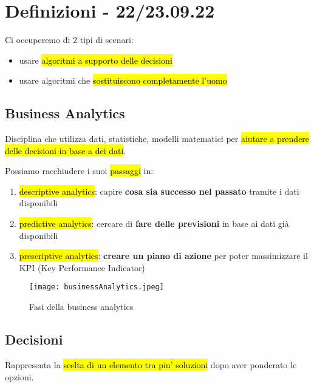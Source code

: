 \section{Definizioni - 22/23.09.22}

Ci occuperemo di 2 tipi di scenari:
\begin{itemize}
	\item usare \hl{algoritmi a supporto delle decisioni}
	\item usare algoritmi che \hl{sostituiscono completamente l'uomo}
\end{itemize}


\subsection{Business Analytics}

Disciplina che utilizza dati, statistiche, modelli matematici per \hl{aiutare a prendere delle decisioni in base a dei dati}.

Possiamo racchiudere i suoi \hl{passaggi} in:
\begin{enumerate}
	\item \hl{descriptive analytics}: capire \textbf{cosa sia successo nel passato} tramite i dati disponibili
	\item \hl{predictive analytics}: cercare di \textbf{fare delle previsioni} in base ai dati già disponibili
	\item \hl{prescriptive analytics}: \textbf{creare un piano di azione} per poter massimizzare il KPI (Key Performance Indicator)
\end{enumerate}

\begin{figure}[H]
\centering
\texttt{[image: businessAnalytics.jpeg]}
\caption{Fasi della business analytics} 
\label{busana}
\end{figure}


\subsection{Decisioni}

Rappresenta la \hl{scelta di un elemento tra piu' soluzioni} dopo aver ponderato le opzioni.

